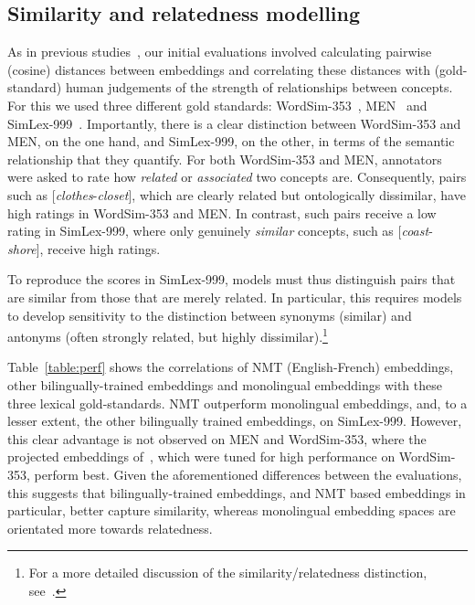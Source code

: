 \documentclass{article} %
\begin{document}
\subsection{Similarity and relatedness modelling}

As in previous studies~\citep{Agirre2009,Bruni2014,baroni2014don}, our initial evaluations involved calculating pairwise (cosine) distances between embeddings and correlating these distances with (gold-standard) human judgements of the strength of relationships between concepts. For this we used three different gold standards: WordSim-353~\citep{Agirre2009}, MEN~\citep{Bruni2014} and SimLex-999~\citep{hill2014simlex}. Importantly, there is a clear distinction between WordSim-353 and MEN, on the one hand, and SimLex-999, on the other, in terms of the semantic relationship that they quantify. For both WordSim-353 and MEN, annotators were asked to rate how \emph{related} or \emph{associated} two concepts are. Consequently, pairs such as [\emph{clothes}-\emph{closet}], which are clearly related but ontologically dissimilar, have high ratings in WordSim-353 and MEN. In contrast, such pairs receive a low rating in SimLex-999, where only genuinely \emph{similar} concepts, such as [\emph{coast}- \emph{shore}], receive high ratings. 

To reproduce the scores in SimLex-999, models must thus distinguish pairs that are similar from those that are merely related. In particular, this requires models to develop sensitivity to the distinction between synonyms (similar) and antonyms (often strongly related, but highly dissimilar).\footnote{For a more detailed discussion of the similarity/relatedness distinction, see~\citep{hill2014simlex}.}

Table~\ref{table:perf} shows the correlations of NMT (English-French) embeddings, other bilingually-trained embeddings and monolingual embeddings with these three lexical gold-standards. NMT outperform monolingual embeddings, and, to a lesser extent, the other bilingually trained embeddings, on SimLex-999. However, this clear advantage is not observed on MEN and WordSim-353, where the projected embeddings of~\cite{faruqui2014improving}, which were tuned for high performance on WordSim-353, perform best. Given the aforementioned differences between the evaluations, this suggests that bilingually-trained embeddings, and NMT based embeddings in particular, better capture similarity, whereas monolingual embedding spaces are orientated more towards relatedness. 
\end{document}

